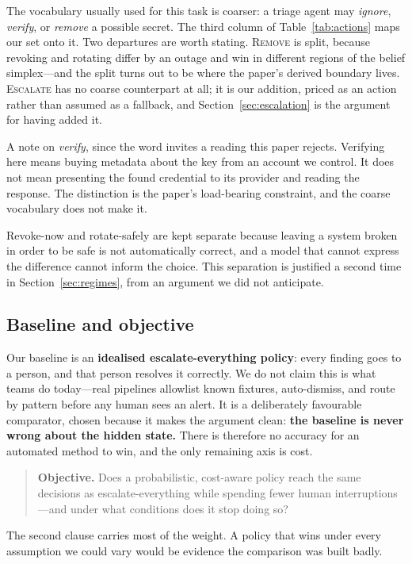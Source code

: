\documentclass{article}
\begin{document}
The vocabulary usually used for this task is coarser: a triage agent may
\emph{ignore}, \emph{verify}, or \emph{remove} a possible secret. The third
column of Table~\ref{tab:actions} maps our set onto it. Two departures are worth
stating. \textsc{Remove} is split, because revoking and rotating differ by an
outage and win in different regions of the belief simplex---and the split turns
out to be where the paper's derived boundary lives. \textsc{Escalate} has no
coarse counterpart at all; it is our addition, priced as an action rather than
assumed as a fallback, and Section~\ref{sec:escalation} is the argument for
having added it.

A note on \emph{verify}, since the word invites a reading this paper rejects.
Verifying here means buying metadata about the key from an account we control.
It does not mean presenting the found credential to its provider and reading the
response. The distinction is the paper's load-bearing constraint, and the
coarse vocabulary does not make it.

Revoke-now and rotate-safely are kept separate because leaving a system broken
in order to be safe is not automatically correct, and a model that cannot
express the difference cannot inform the choice. This separation is justified a
second time in Section~\ref{sec:regimes}, from an argument we did not
anticipate.

\subsection{Baseline and objective}

Our baseline is an \textbf{idealised escalate-everything policy}: every finding
goes to a person, and that person resolves it correctly. We do not claim this is
what teams do today---real pipelines allowlist known fixtures, auto-dismiss, and
route by pattern before any human sees an alert. It is a deliberately favourable
comparator, chosen because it makes the argument clean: \textbf{the baseline is
never wrong about the hidden state.} There is therefore no accuracy for an
automated method to win, and the only remaining axis is cost.

\begin{quote}
\textbf{Objective.} Does a probabilistic, cost-aware policy reach the same
decisions as escalate-everything while spending fewer human interruptions---and
under what conditions does it stop doing so?
\end{quote}

The second clause carries most of the weight. A policy that wins under every
assumption we could vary would be evidence the comparison was built badly.
\end{document}
